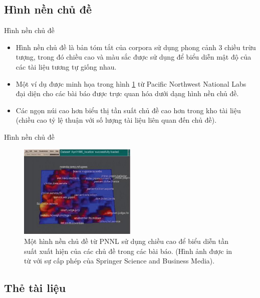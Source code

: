 \documentclass[10pt]{beamer}
\theoremstyle{remark}
\theoremstyle{definition}
\begin{document}
\subsection{Hình nền chủ đề}

\begin{frame}{Hình nền chủ đề}
	\begin{itemize}
		\item Hình nền chủ đề là bản tóm tắt của corpora sử dụng phong cảnh 3 chiều trừu tượng, trong đó chiều cao và màu sắc được sử dụng để biểu diễn mật độ của các tài liệu tương tự giống nhau.
		\item Một ví dụ được minh họa trong hình \ref{fig:11} từ Pacific Northwest National Labs \cite{407} đại diện cho các bài báo được trực quan hóa dưới dạng hình nền chủ đề.
		\item Các ngọn núi cao hơn biểu thị tần suất chủ đề cao hơn trong kho tài liệu (chiều cao tỷ lệ thuận với số lượng tài liệu liên quan đến chủ đề).
	\end{itemize}
\end{frame}

\begin{frame}{Hình nền chủ đề}
	\begin{figure}[h!]
        \centering
        \includegraphics[width=0.5\textwidth]{11.png}
        \caption{Một hình nền chủ đề từ PNNL sử dụng chiều cao để biểu diễn tần suất xuất hiện của các chủ đề trong các bài báo. (Hình ảnh được in từ \cite{407} với sự cấp phép của  Springer Science and Business Media).}
        \label{fig:11}
    \end{figure}
\end{frame}

\subsection{Thẻ tài liệu}
\end{document}
